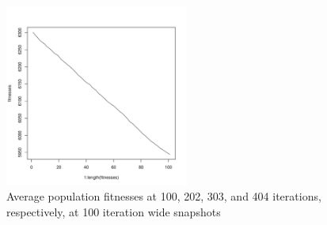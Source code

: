 \documentclass[12pt]{article}
\begin{document}
\begin{figure}[!h]
\begin{center}
		\includegraphics[width=60mm]{images/schwefel.ss/avg_404.pdf}
               	\caption{Average population fitnesses at 100, 202, 303, and 404 iterations, respectively, at 100 iteration wide snapshots}
                \label{schwefel_ss_avg_pop_fit}
        \end{center}
\end{figure}


\pagebreak
\end{document}
